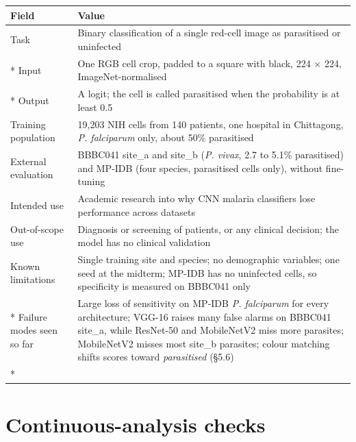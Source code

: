 \documentclass[11pt,a4paper]{article}
\begin{document}
{\small
\begin{longtable}{@{}>{\raggedright\arraybackslash\hspace{0pt}}p{69.8pt}>{\raggedright\arraybackslash\hspace{0pt}}p{266.2pt}@{}}
\toprule
Field & Value \\
\midrule
\endhead
\bottomrule
\endfoot
\bottomrule
\endlastfoot
Task & Binary classification of a single red-cell image as parasitised or uninfected \\*
Input & One RGB cell crop, padded to a square with black, 224 $\times$ 224, ImageNet-normalised \\*
Output & A logit; the cell is called parasitised when the probability is at least 0.5 \\
Training population & 19,203 NIH cells from 140 patients, one hospital in Chittagong, \emph{P. falciparum} only, about 50\% parasitised \\
External evaluation & BBBC041 site\_\allowbreak{}a and site\_\allowbreak{}b (\emph{P. vivax}, 2.7 to 5.1\% parasitised) and MP-IDB (four species, parasitised cells only), without fine-tuning \\
Intended use & Academic research into why CNN malaria classifiers lose performance across datasets \\
Out-of-scope use & Diagnosis or screening of patients, or any clinical decision; the model has no clinical validation \\
Known limitations & Single training site and species; no demographic variables; one seed at the midterm; MP-IDB has no uninfected cells, so specificity is measured on BBBC041 only \\*
Failure modes seen so far & Large loss of sensitivity on MP-IDB \emph{P. falciparum} for every architecture; VGG-16 raises many false alarms on BBBC041 site\_\allowbreak{}a, while ResNet-50 and \mbox{MobileNetV2} miss more parasites; \mbox{MobileNetV2} misses most site\_\allowbreak{}b parasites; colour matching shifts scores toward \emph{parasitised} (\S{}5.6) \\*
\end{longtable}}
\addtocounter{table}{-1}

\clearpage
\section{Continuous-analysis checks}
\end{document}

